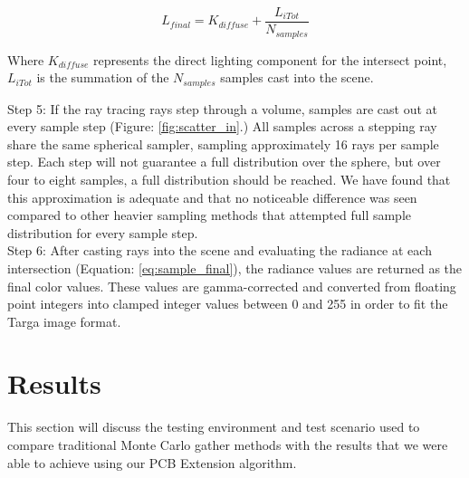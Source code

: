 \documentclass[12pt]{ucthesis}
\begin{document}
\begin{equation}
    L_{final} = K_{diffuse} + \frac{L_{iTot}}{N_{samples}} %
    \label{eq:sample_final}
\end{equation}



Where $K_{diffuse}$ represents the direct lighting component for the intersect point, $L_{iTot}$ is the summation of the $N_{samples}$ samples cast into the scene. %

Step 5:  If the ray tracing rays step through a volume, samples are cast out at every sample step (Figure: \ref{fig:scatter_in}.)  All samples across a stepping ray share the same spherical sampler, sampling approximately 16 rays per sample step.  Each step will not guarantee a full distribution over the sphere, but over four to eight samples, a full distribution should be reached.  We have found that this approximation is adequate and that no noticeable difference was seen compared to other heavier sampling methods that attempted full sample distribution for every sample step.\\

Step 6:  After casting rays into the scene and evaluating the radiance at each intersection (Equation: \ref{eq:sample_final}), the radiance values are returned as the final color values.  These values are gamma-corrected and converted from floating point integers into clamped integer values between 0 and 255 in order to fit the Targa image format.

\chapter{Results}

This section will discuss the testing environment and test scenario used to compare traditional Monte Carlo gather methods with the results that we were able to achieve using our PCB Extension algorithm.
\end{document}
